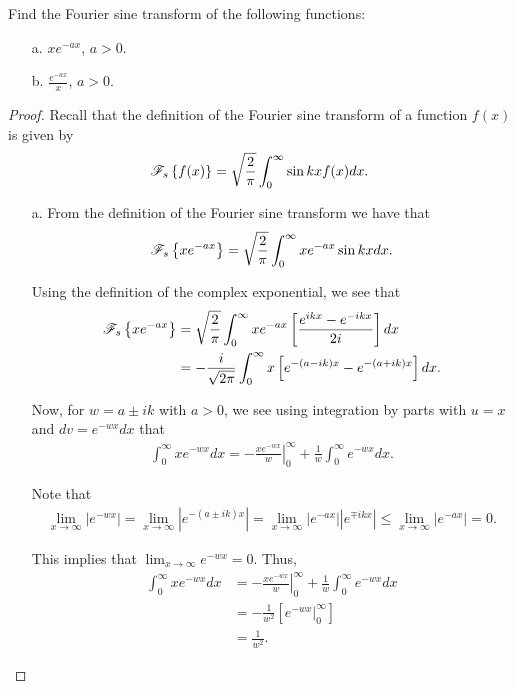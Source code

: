 \begin{problem}{2.15}
  Find the Fourier sine transform of the following functions:
  \begin{enumerate}
    \item[a.] $x e^{-a x}$, $a > 0$.
    \item [b.] $\displaystyle \frac{e^{-ax}}{x}$, $a > 0$.
  \end{enumerate}
\end{problem}

\begin{proof}
  Recall that the definition of the Fourier sine transform of a function $f(x)$
  is given by
  \begin{align*}
    \mathscr{F}_s\left\{ {f(x)} \right\} = \sqrt{\frac{2}{\pi}} \int_0^\infty \sin kx f(x) dx.
  \end{align*}
  \begin{enumerate}
    \item[a.] From the definition of the Fourier sine transform we have that
      \begin{align*}
        \mathscr{F}_s\left\{ {xe^{-ax}} \right\} = \sqrt{\frac{2}{\pi}} \int_0^\infty x e^{-ax}\sin kx  dx.
      \end{align*}

      Using the definition of the complex exponential, we see that
      \begin{align*}
        \mathscr{F}_s\left\{ {xe^{-ax}} \right\}
        &= \sqrt{\frac{2}{\pi}} \int_0^\infty x e^{-ax}\left[\frac{e^{ikx} - e^{-ikx}}{2i}\right]  dx \\
        &= -\frac{i}{\sqrt{2\pi}} \int_0^\infty x \left[e^{-(a-ik)x} - e^{-(a+ik)x}\right]  dx.
      \end{align*}

      Now, for $w = a \pm ik$ with $a > 0$, we see using integration by parts with $u = x$ and $dv =e^{-wx}dx$ that
      \begin{align*}
        \int_{0}^\infty x e^{-wx}dx = \left.-\frac{xe^{-wx}}{w}\right\rvert_{0}^\infty + \frac{1}{w} \int_0^\infty e^{-wx} dx.
      \end{align*}

      Note that
      \begin{align*}
        \lim_{x\to\infty} \left| e^{-wx} \right| = \lim_{x\to\infty} \left|e^{-(a\pm ik)x}\right| = \lim_{x\to\infty} \left|e^{-ax}\right|  \left|e^{\mp ikx}\right| \leq \lim_{x\to\infty} \left|e^{-ax}\right|  = 0.
      \end{align*}

      This implies that $\lim_{x\to\infty} e^{-wx} = 0$. Thus,
      \begin{align*}
        \int_{0}^\infty x e^{-wx}dx &= \left.-\frac{xe^{-wx}}{w}\right\rvert_{0}^\infty + \frac{1}{w} \int_0^\infty e^{-wx} dx \\
        &=  -\frac{1}{w^2} \left[ \left.e^{-wx}\right\rvert_{0}^{\infty} \right] \\
        &= \frac{1}{w^2}.
      \end{align*}


\end{enumerate}
\end{proof}

